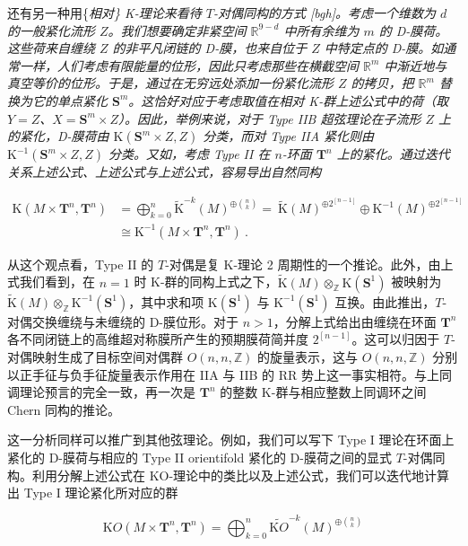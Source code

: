 \documentclass[11pt,a4paper]{ctexart}
\begin{document}
还有另一种用\{\it 相对\} K-理论来看待 \(T\)-对偶同构的方式 [bgh]。考虑一个维数为 \(d\) 的一般紧化流形 \(Z\)。我们想要确定非紧空间 \({\mathbb{R}}^{9-d}\) 中所有余维为 \(m\) 的 D-膜荷。这些荷来自缠绕 \(Z\) 的非平凡闭链的 D-膜，也来自位于 \(Z\) 中特定点的 D-膜。如通常一样，人们考虑有限能量的位形，因此只考虑那些在横截空间 \({\mathbb{R}}^m\) 中渐近地与真空等价的位形。于是，通过在无穷远处添加一份紧化流形 \(Z\) 的拷贝，把 \({\mathbb{R}}^m\) 替换为它的单点紧化 \({\mathbf S}^m\)。这恰好对应于考虑取值在相对 K-群上述公式中的荷（取 \(Y=Z\)、\(X={\mathbf S}^m\times
Z\)）。因此，举例来说，对于 Type IIB 超弦理论在子流形 \(Z\) 上的紧化，D-膜荷由 \({\mathrm K}({\mathbf S}^m\times Z,Z)\) 分类，而对 Type IIA 紧化则由 \({\mathrm K}^{-1}({\mathbf S}^m\times Z,Z)\) 分类。又如，考虑 Type II 在 \(n\)-环面 \({\mathbf T}^n\) 上的紧化。通过迭代关系上述公式、上述公式与上述公式，容易导出自然同构

\[\begin{matrix}
{\mathrm K}(M\times{\mathbf T}^n,{\mathbf
T}^n)&=\bigoplus_{k=0}^n\widetilde{{\mathrm K}}^{-k}(M)^{\oplus\binom{n}{k}}
=~\widetilde{{\mathrm K}}(M)^{\oplus2^[n-1]}\oplus{\mathrm K}^{-1}(M)^{\oplus2^[n-1]}\\
&\cong{\mathrm K}^{-1}(M\times{\mathbf T}^n,{\mathbf T}^n)\ .
\end{matrix}\]

从这个观点看，Type II 的 \(T\)-对偶是复 K-理论 2 周期性的一个推论。此外，由上式我们看到，在 \(n=1\) 时 K-群的同构上式之下，\(\widetilde{\mathrm K}(M)\otimes_{\mathbb{Z}}{\mathrm K}({\mathbf
S}^1)\) 被映射为 \(\widetilde{\mathrm K}(M)\otimes_{\mathbb{Z}}{\mathrm K}^{-1}({\mathbf S}^1)\)，其中求和项 \({\mathrm K}({\mathbf
S}^1)\) 与 \({\mathrm K}^{-1}({\mathbf S}^1)\) 互换。由此推出，\(T\)-对偶交换缠绕与未缠绕的 D-膜位形。对于 \(n>1\)，分解上式给出由缠绕在环面 \({\mathbf
T}^n\) 各不同闭链上的高维超对称膜所产生的预期膜荷简并度 \(2^[n-1]\)。这可以归因于 \(T\)-对偶映射生成了目标空间对偶群 \(O(n,n,{\mathbb{Z}})\) 的旋量表示，这与 \(O(n,n,{\mathbb{Z}})\) 分别以正手征与负手征旋量表示作用在 IIA 与 IIB 的 RR 势上这一事实相符。与上同调理论预言的完全一致，再一次是 \({\mathbf T}^n\) 的整数 K-群与相应整数上同调环之间 Chern 同构的推论。

这一分析同样可以推广到其他弦理论。例如，我们可以写下 Type I 理论在环面上紧化的 D-膜荷与相应的 Type II orientifold 紧化的 D-膜荷之间的显式 \(T\)-对偶同构。利用分解上述公式在 KO-理论中的类比以及上述公式，我们可以迭代地计算出 Type I 理论紧化所对应的群

\[{\mathrm KO}(M\times{\mathbf T}^n,{\mathbf
T}^n)=\bigoplus_{k=0}^n\widetilde{\mathrm KO}^{-k}(M)^{\oplus\binom{n}{k}}\]
\end{document}
